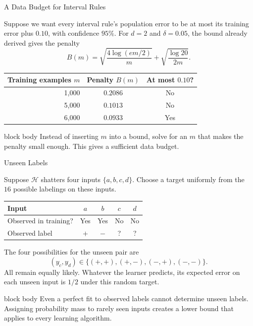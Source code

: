 \documentclass[aspectratio=169,10pt]{beamer}
\newcommand{\Hc}{\mathcal{H}}
\newcommand{\KeyBox}[1]{%
  \begin{beamercolorbox}[rounded=true,sep=0.22cm,wd=\linewidth]{block body}
    #1
  \end{beamercolorbox}%
}
\begin{document}
\begin{frame}[t]{A Data Budget for Interval Rules}
  \vspace{0.04cm}
  \small

  Suppose we want every interval rule's population error to be at most
  its training error plus $0.10$, with confidence $95\%$.
  For $d=2$ and $\delta=0.05$, the bound already derived gives the penalty
  \[
    B(m)=\sqrt{\frac{4\log(em/2)}{m}}
         +\sqrt{\frac{\log20}{2m}}.
  \]
  \begin{center}
  \renewcommand{\arraystretch}{1.15}
  \begin{tabular}{rcc}
    \toprule
    Training examples $m$ & Penalty $B(m)$ & At most $0.10$?\\
    \midrule
    1,000 & $0.2086$ & No\\
    5,000 & $0.1013$ & No\\
    6,000 & $0.0933$ & Yes\\
    \bottomrule
  \end{tabular}
  \end{center}
  \KeyBox{Instead of inserting $m$ into a bound, solve for an $m$ that makes
  the penalty small enough. This gives a sufficient data budget.}

\end{frame}

\begin{frame}[t]{Unseen Labels}
  \vspace{0.04cm}
  \small

  Suppose $\Hc$ shatters four inputs $\{a,b,c,d\}$. Choose a target
  uniformly from the $16$ possible labelings on these inputs.
  \begin{center}
  \renewcommand{\arraystretch}{1.15}
  \begin{tabular}{lcccc}
    \toprule
    Input & $a$ & $b$ & $c$ & $d$\\
    \midrule
    Observed in training? & Yes & Yes & No & No\\
    Observed label & $+$ & $-$ & ? & ?\\
    \bottomrule
  \end{tabular}
  \end{center}
  The four possibilities for the unseen pair are
  \[
    (y_c,y_d)\in\{(+,+),(+,-),(-,+),(-,-)\}.
  \]
  All remain equally likely. Whatever the learner predicts, its expected
  error on each unseen input is $1/2$ under this random target.
  \vspace{0.16cm}
  \KeyBox{Even a perfect fit to observed labels cannot determine unseen
  labels. Assigning probability mass to rarely seen inputs creates a
  lower bound that applies to every learning algorithm.}

\end{frame}
\end{document}
